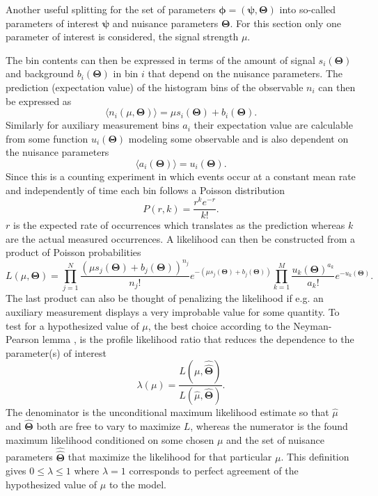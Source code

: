 Another useful splitting for the set of parameters $\bm{\phi}=(\bm{\psi},\bm{\Theta})$ into so-called parameters of interest $\bm{\psi}$ and nuisance parameters $\bm{\Theta}$. For this section only one parameter of interest is considered, the signal strength $\mu$. 

The bin contents can then be expressed in terms of the amount of signal $s_i(\bm{\Theta})$ and background $b_i(\bm{\Theta})$ in bin $i$ that depend on the nuisance parameters. The prediction (expectation value) of the histogram bins of the observable $n_i$ can then be expressed as 
\begin{equation} \label{eq:n_i}
    \langle n_i(\mu,\bm{\Theta})\rangle = \mu s_i(\bm{\Theta}) +b_i(\bm{\Theta}). 
\end{equation}
Similarly for auxiliary measurement bins $a_i$ their expectation value are calculable from some function $u_i(\bm{\Theta})$ modeling some observable and is also dependent on the nuisance parameters
\begin{equation} \label{eq:a_i}
    \langle a_i(\bm{\Theta}) \rangle = u_i(\bm{\Theta}).
\end{equation}
Since this is a counting experiment in which events occur at a constant mean rate and independently of time each bin follows a Poisson distribution
\begin{equation}\label{eq:poisson}
    P(r,k)=\frac{r^k e^{-r}}{k!}.
\end{equation}
$r$ is the expected rate of occurrences which translates as the prediction whereas $k$ are the actual measured occurrences. A likelihood can then be constructed from a product of Poisson probabilities
\begin{equation}\label{eq:likelihood}
    L(\mu,\bm{\Theta})=
    \prod_{j=1}^N \frac{(\mu s_j(\bm{\Theta}) + b_j(\bm{\Theta}))^{n_j}}{n_j !} e^{-(\mu s_j(\bm{\Theta}) + b_j(\bm{\Theta}))}
    \prod_{k=1}^M \frac{u_k(\bm{\Theta})^{a_k}}{a_k!} e^{-u_k(\bm{\Theta})}.
\end{equation}
The last product can also be thought of penalizing the likelihood if e.g. an auxiliary measurement displays a very improbable value for some quantity. To test for a hypothesized value of $\mu$, the best choice according to the Neyman-Pearson lemma \citep{behnke2013data}, is the profile likelihood ratio that reduces the dependence to the parameter(s) of interest
\begin{equation}\label{eq:likelihood_ratio}
\lambda(\mu)=
    \frac{L(\mu,\hat{\hat{\bm{\Theta}}})}
    {L(\hat{\mu},\hat{\bm{\Theta}})}.
\end{equation}
The denominator is the unconditional maximum likelihood estimate so that $\hat{\mu}$ and $\hat{\bm{\Theta}}$ both are free to vary to maximize $L$, whereas the numerator is the found maximum likelihood conditioned on some chosen $\mu$ and the set of nuisance parameters $\hat{\hat{\bm{\Theta}}}$ that maximize the likelihood for that particular $\mu$. This definition gives $0 \leq \lambda \leq 1$ where $\lambda = 1$ corresponds to perfect agreement of the hypothesized value of $\mu$ to the model.


